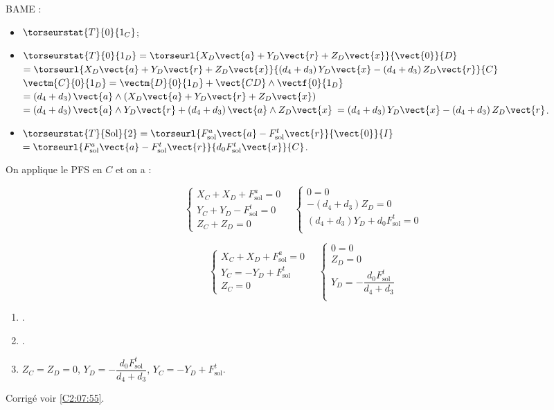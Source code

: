 BAME :
\begin{itemize}
\item $\torseurstat{T}{0}{1_C}$;
\item $\torseurstat{T}{0}{1_D} =  \torseurl{X_D\vect{a}+Y_D\vect{r}+Z_D\vect{x}}{\vect{0}}{D}$ 
$=  \torseurl{X_D\vect{a}+Y_D\vect{r}+Z_D\vect{x}}{ \left( d_4 +d_3 \right) Y_D \vect{x}-\left( d_4 +d_3 \right)  Z_D\vect{r}}{C}$
$\vectm{C}{0}{1_D}= \vectm{D}{0}{1_D} + \vect{CD}\wedge \vectf{0}{1_D}$
$= \left( d_4 +d_3 \right) \vect{a} \wedge \left( X_D\vect{a}+Y_D\vect{r}+Z_D\vect{x}\right)$
$= \left( d_4 +d_3 \right) \vect{a} \wedge  Y_D\vect{r}+\left( d_4 +d_3 \right) \vect{a} \wedge Z_D\vect{x}$
$= \left( d_4 +d_3 \right) Y_D \vect{x}-\left( d_4 +d_3 \right)  Z_D\vect{r}$.
\item $\torseurstat{T}{\text{Sol}}{2} =\torseurl{F_{\text{sol}}^a \vect{a}-F_{\text{sol}}^t \vect{r}}{\vect{0}}{I} $ 
$=\torseurl{F_{\text{sol}}^a \vect{a}-F_{\text{sol}}^t \vect{r}}{d_0F_{\text{sol}}^t \vect{x}}{C} $.
\end{itemize}

On applique le PFS en $C$ et on a : 

$$
\left\{
\begin{array}{l}
X_C + X_D + F_{\text{sol}}^a = 0\\
Y_C + Y_D - F_{\text{sol}}^t = 0\\
Z_C + Z_ D = 0 
\end{array}
\right.
\quad 
\left\{ 
\begin{array}{l}
0 = 0\\
-\left( d_4 +d_3 \right)  Z_D = 0 \\
\left( d_4 +d_3 \right) Y_D  + d_0F_{\text{sol}}^t= 0\\
\end{array}
\right.
$$

\else
\fi



\ifprof
$$
\left\{
\begin{array}{l}
X_C + X_D + F_{\text{sol}}^a = 0\\
Y_C =- Y_D + F_{\text{sol}}^t \\
Z_C = 0 
\end{array}
\right.
\quad 
\left\{ 
\begin{array}{l}
0 = 0\\
  Z_D = 0 \\
 Y_D  = -  \dfrac{d_0F_{\text{sol}}^t}{d_4 +d_3}\\
\end{array}
\right.
$$

\else
\fi

\ifprof
\else
\ifcolle
\else
\footnotesize
\begin{enumerate}
\item .
\item .
\item $Z_C = Z_D = 0$, $ Y_D  = -  \dfrac{d_0F_{\text{sol}}^t}{d_4 +d_3}$, 
$Y_C =- Y_D + F_{\text{sol}}^t $.
\end{enumerate}
\normalsize
\fi
\begin{flushright}
\footnotesize{Corrigé  voir \ref{C2:07:55}.}
\end{flushright}%
\fi 
